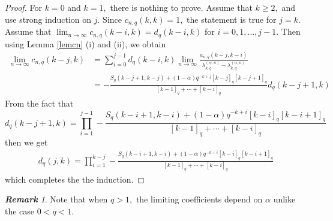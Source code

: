 \documentclass[12pt]{article}
\numberwithin{equation}{section} \theoremstyle{plain}
\theoremstyle{definition}
\theoremstyle{remark}
\newtheorem{remark}{\rm\bf Remark}[section]
\begin{document}
\begin{proof}
For $k=0$ and $k=1,$ there is nothing to prove. Assume that $k\geq 2,$ and use strong induction on $j.$ Since $c_{n,q}(k,k)=1,$ the statement is true for $j=k.$ 
Assume that $\lim_{n\to\infty} c_{n,q}(k-i,k)=d_q(k-i,k)$ for $i=0,1,\ldots,j-1.$ Then using Lemma \ref{lemcn} (i) and (ii), we obtain
\begin{align*}
\lim_{n\to\infty} c_{n,q}(k-j,k)&=\sum_{i=0}^{j-1}d_q(k-i,k)\lim_{n\to\infty}\frac{a_{n,q}(k-j,k-i)}{\lambda_{k,q}^{(\alpha,n)}-\lambda_{k,q}^{(\alpha,n)}}\\
&=-\frac{S_q(k-j+1, k-j)+(1-\alpha)q^{-k+j}[k-j]_q[k-j+1]_q}{[k-1]_q+\cdots+[k-i]_q}d_q(k-j+1,k)
\end{align*}
From the fact that 
$$d_q(k-j+1,k)=\prod_{i=1}^{j-1}-\frac{S_q(k-i+1, k-i)+(1-\alpha)q^{-k+i}[k-i]_q[k-i+1]_q}{[k-1]_q+\cdots+[k-i]_q}$$
then we get 
\begin{eqnarray*}
d_q(j,k)=\prod_{i=1}^{k-j}-\frac{S_q(k-i+1, k-i)+(1-\alpha)q^{-k+i}[k-i]_q[k-i+1]_q}{[k-1]_q+\cdots+[k-i]_q}
\end{eqnarray*}
which completes the the induction.
\end{proof}

\begin{remark} Note that when $q>1,$ the limiting coefficients depend on $\alpha$ unlike the case $0<q<1.$ 
\end{remark}
\end{document}
